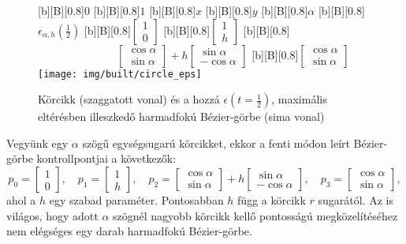 \documentclass[12pt]{report}
\theoremstyle{definition}
\begin{document}
  \begin{figure}
  [b][B][0.8]{\bf{$0$}}
  [b][B][0.8]{\bf{$1$}}
  [b][B][0.8]{\bf{$x$}}
  [b][B][0.8]{\bf{$y$}}
  [b][B][0.8]{\bf{$\alpha$}}
  [b][B][0.8]{\bf{$\epsilon_{\alpha,h}(\frac{1}{2})$}\qquad}
  [b][B][0.8]{\bf{$\begin{bmatrix} 1 \\ 0 \end{bmatrix}$}}
  [b][B][0.8]{\bf{$\begin{bmatrix} 1 \\ h \end{bmatrix}$}}
  [b][B][0.8]{\bf{$\hspace{3cm}\begin{bmatrix}\cos\alpha\\ \sin\alpha
                              \end{bmatrix} + h \begin{bmatrix} \sin\alpha \\
                              -\cos\alpha \end{bmatrix}$}}
  [b][B][0.8]{\bf{$\begin{bmatrix}\cos\alpha\\ \sin\alpha
                              \end{bmatrix}$}}
    \centering
    \texttt{[image: img/built/circle\_eps]}
    \caption{\label{fig:circle} Körcikk (szaggatott vonal) és a hozzá
    $\epsilon(t=\frac{1}{2})$, maximális eltérésben illeszkedő harmadfokú
    Bézier-görbe (sima vonal)}
  \end{figure}

Vegyünk egy $\alpha$ szögű egységsugarú körcikket, ekkor a fenti módon leírt
Bézier-görbe kontrollpontjai a következők:
\[p_0 = \begin{bmatrix} 1 \\ 0 \end{bmatrix},\quad
  p_1 = \begin{bmatrix} 1 \\ h \end{bmatrix},\quad
  p_2 = \begin{bmatrix} \cos\alpha \\ \sin\alpha \end{bmatrix} + h
        \begin{bmatrix} \sin\alpha \\ -\cos\alpha \end{bmatrix},\quad
  p_3 = \begin{bmatrix} \cos\alpha \\ \sin\alpha \end{bmatrix}, \]
ahol a $h$ egy szabad paraméter. Pontosabban $h$ függ a körcikk $r$ sugarától.
Az is világos, hogy adott $\alpha$ szögnél nagyobb körcikk kellő pontosságú
megközelítéséhez nem elégséges egy darab harmadfokú Bézier-görbe.
\end{document}
